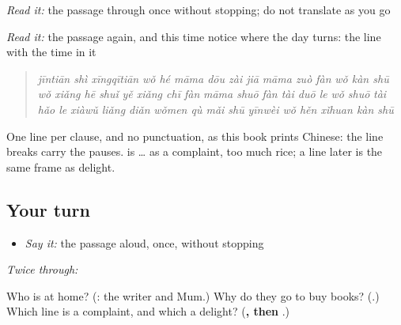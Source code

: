 \begin{tcolorbox}[breakable,skin=enhanced,colback=orange!6,colframe=orange!45!black,boxrule=0.5pt,arc=1mm,left=6pt,right=6pt,top=4pt,bottom=4pt,fonttitle=\bfseries,title={Read this}]
\begin{quote}
            
\end{quote}

\emph{Read it:} the passage through once without stopping; do not translate as you go

\emph{Read it:} the passage again, and this time notice where the day turns: the line with the time in it
\end{tcolorbox}

\begin{tcolorbox}[breakable,skin=enhanced,colback=orange!6,colframe=orange!45!black,boxrule=0.5pt,arc=1mm,left=6pt,right=6pt,top=4pt,bottom=4pt,fonttitle=\bfseries,title={Read this}]
\begin{quote}
\emph{jīntiān shì xīngqītiān} \emph{wǒ hé māma dōu zài jiā} \emph{māma zuò fàn} \emph{wǒ kàn shū} \emph{wǒ xiǎng hē shuǐ} \emph{yě xiǎng chī fàn} \emph{māma shuō} \emph{fàn tài duō le} \emph{wǒ shuō} \emph{tài hǎo le} \emph{xiàwǔ liǎng diǎn} \emph{wǒmen qù mǎi shū} \emph{yīnwèi wǒ hěn xǐhuan kàn shū}
\end{quote}

One line per clause, and no punctuation, as this book prints Chinese: the line breaks carry the pauses.  is  …  as a complaint, too much rice;  a line later is the same frame as delight.
\end{tcolorbox}

\subsection*{Your turn}
\begin{itemize}
\raggedright
  \item \emph{Say it:} the passage aloud, once, without stopping
\end{itemize}

\emph{Twice through:}

\begin{tcolorbox}[breakable,colback=teal!4,colframe=teal!35!black,title={Before you move on}]
Who is at home? (\textbf{}: the writer and Mum.) Why do they go to buy books? (\textbf{}.) Which line is a complaint, and which a delight? (\textbf{, then }.)
\end{tcolorbox}
